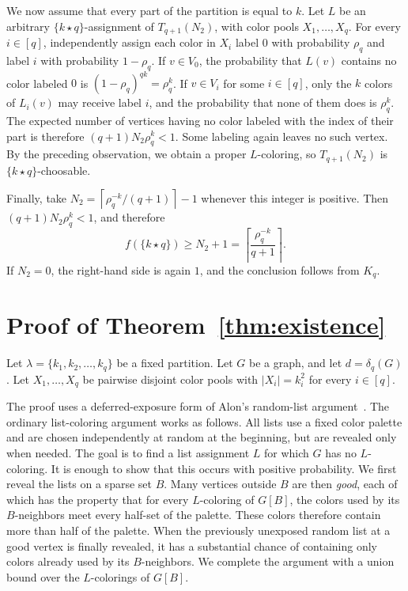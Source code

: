 \documentclass[10pt,a4paper]{amsart}
\numberwithin{equation}{section}
\newcommand{\equalparts}[2]{\{#1\star #2\}}
\begin{document}
We now assume that every part of the partition is equal to $k$. Let $L$ be an
arbitrary $\equalparts{k}{q}$-assignment of $T_{q+1}(N_2)$, with color pools
$X_1,\ldots,X_q$. For every $i\in[q]$, independently assign each color in
$X_i$ label $0$ with probability $\rho_q$ and label $i$ with probability
$1-\rho_q$. If $v\in V_0$, the probability that $L(v)$ contains no color
labeled $0$ is $(1-\rho_q)^{qk}=\rho_q^k$.
If $v\in V_i$ for some $i\in[q]$, only the $k$ colors of $L_i(v)$  
may receive label $i$, and the probability that none of them does is
$\rho_q^k$.
The expected number of vertices having no color labeled with the index of
their part is therefore $(q+1)N_2\rho_q^k<1$.
Some labeling again leaves no such vertex. By the preceding observation,
we obtain a proper $L$-coloring, so $T_{q+1}(N_2)$ is
$\equalparts{k}{q}$-choosable.

Finally, take $N_2=\left\lceil \rho_q^{-k}/(q+1)\right\rceil-1$
whenever this integer is positive. Then $(q+1)N_2\rho_q^k<1$, and therefore
\[
 f(\equalparts{k}{q})\geq N_2+1
 =\left\lceil\frac{\rho_q^{-k}}{q+1}\right\rceil.
\]
If $N_2=0$, the right-hand side is again $1$, and the conclusion follows from
$K_q$.


\section{Proof of Theorem~\ref{thm:existence}}
\label{sec:surrounded}

Let $\lambda=\{k_1,k_2,\ldots,k_q\}$ be a fixed partition. Let $G$ be a
graph, and let $d=\delta_q(G)$.
Let $X_1,\ldots,X_q$ be pairwise disjoint color pools with $|X_i| = k_i^2$ for every $i \in [q]$.
 

The proof uses a deferred-exposure form of Alon's random-list
argument~\cite{Alon2000}. The ordinary list-coloring argument works as
follows. All lists use a fixed color palette and are chosen independently at
random at the beginning, but are revealed only when needed. The goal is to
find a list assignment $L$ for which $G$ has no $L$-coloring. It is enough
to show that this occurs with positive probability. We first reveal
the lists on a sparse set $B$. Many vertices outside $B$ are then
\emph{good}, each of which has the property that for every $L$-coloring of
$G[B]$, the colors used by its $B$-neighbors meet every half-set of the
palette. These colors therefore contain more than half of the palette. When
the previously unexposed random list at a good vertex is finally revealed,
it has a substantial chance of containing only colors already used by its
$B$-neighbors. We complete the argument with a union bound over the
$L$-colorings of $G[B]$.
\end{document}
